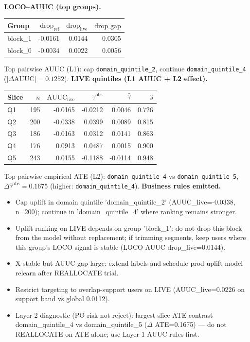 \documentclass{article}
\begin{document}
\noindent\textbf{LOCO--AUUC (top groups).}
\begin{center}\small
\begin{tabular}{lrrr}
\toprule Group & $\mathrm{drop}_{\mathrm{ref}}$ & $\mathrm{drop}_{\mathrm{live}}$ & $\mathrm{drop\_gap}$ \\
\midrule
block\_1 & -0.0161 & 0.0144 & 0.0305 \\
block\_0 & -0.0034 & 0.0022 & 0.0056 \\
\bottomrule\end{tabular}\end{center}
\noindent Top pairwise AUUC (L1): cap \texttt{domain\_quintile\_2}, continue \texttt{domain\_quintile\_4} ($|\Delta\mathrm{AUUC}|=0.1252$).
\noindent\textbf{LIVE quintiles (L1 AUUC + L2 effect).}
\begin{center}\small
\begin{tabular}{lrrrrr}
\toprule Slice & $n$ & $\mathrm{AUUC}_{\mathrm{live}}$ & $\widehat{\tau}^{\mathrm{obs}}$ & $\bar{\hat\tau}$ & $\hat s$ \\
\midrule
Q1 & 195 & -0.0165 & -0.0212 & 0.0046 & 0.726 \\
Q2 & 200 & -0.0338 & 0.0399 & 0.0089 & 0.815 \\
Q3 & 186 & -0.0163 & 0.0312 & 0.0141 & 0.863 \\
Q4 & 176 & 0.0913 & 0.0487 & 0.0015 & 0.900 \\
Q5 & 243 & 0.0155 & -0.1188 & -0.0114 & 0.948 \\
\bottomrule\end{tabular}\end{center}
\noindent Top pairwise empirical ATE (L2): \texttt{domain\_quintile\_4} vs \texttt{domain\_quintile\_5}, $\Delta\widehat{\tau}^{\mathrm{obs}}=0.1675$ (higher: \texttt{domain\_quintile\_4}).
\noindent\textbf{Business rules emitted.}
\begin{itemize}\itemsep2pt
\item[\textsc{REALLOCATE} (P1).] Cap uplift in domain quintile 'domain\_quintile\_2' (AUUC\_live=-0.0338, n=200); continue in 'domain\_quintile\_4' where ranking remains stronger.
\item[\textsc{REALLOCATE} (P2).] Uplift ranking on LIVE depends on group 'block\_1': do not drop this block from the model without replacement; if trimming segments, keep users where this group's LOCO signal is stable (LOCO AUUC drop\_live=0.0144).
\item[\textsc{RELEARN} (P2).] X stable but AUUC gap large: extend labels and schedule prod uplift model relearn after REALLOCATE trial.
\item[\textsc{REALLOCATE} (P3).] Restrict targeting to overlap-support users on LIVE (AUUC\_live=0.0226 on support band vs global 0.0112).
\item[\textsc{MONITOR} (P4).] Layer-2 diagnostic (PO-risk not reject): largest slice ATE contrast domain\_quintile\_4 vs domain\_quintile\_5 ($\Delta$ ATE=0.1675) --- do not REALLOCATE on ATE alone; use Layer-1 AUUC rules first.
\end{itemize}
\end{document}
